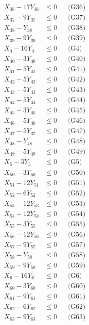 \documentclass[a4paper,10pt]{article}
\begin{document}
{\begin{align}
X_{36} - 17Y_{36} &\leq 0 && \text{(G36)} \\
X_{37} - 9Y_{37} &\leq 0 && \text{(G37)} \\
X_{38} - Y_{38} &\leq 0 && \text{(G38)} \\
X_{39} - 9Y_{39} &\leq 0 && \text{(G39)} \\
X_{4} - 16Y_{4} &\leq 0 && \text{(G4)} \\
X_{40} - 3Y_{40} &\leq 0 && \text{(G40)} \\
X_{41} - 5Y_{41} &\leq 0 && \text{(G41)} \\
X_{42} - 5Y_{42} &\leq 0 && \text{(G42)} \\
X_{43} - 5Y_{43} &\leq 0 && \text{(G43)} \\
X_{44} - 5Y_{44} &\leq 0 && \text{(G44)} \\
\allowbreak
X_{45} - 3Y_{45} &\leq 0 && \text{(G45)} \\
X_{46} - 5Y_{46} &\leq 0 && \text{(G46)} \\
X_{47} - 5Y_{47} &\leq 0 && \text{(G47)} \\
X_{48} - Y_{48} &\leq 0 && \text{(G48)} \\
X_{49} - 5Y_{49} &\leq 0 && \text{(G49)} \\
X_{5} - 3Y_{5} &\leq 0 && \text{(G5)} \\
X_{50} - 3Y_{50} &\leq 0 && \text{(G50)} \\
X_{51} - 12Y_{51} &\leq 0 && \text{(G51)} \\
X_{52} - 6Y_{52} &\leq 0 && \text{(G52)} \\
X_{53} - 12Y_{53} &\leq 0 && \text{(G53)} \\
X_{54} - 12Y_{54} &\leq 0 && \text{(G54)} \\
X_{55} - 3Y_{55} &\leq 0 && \text{(G55)} \\
X_{56} - 12Y_{56} &\leq 0 && \text{(G56)} \\
X_{57} - 9Y_{57} &\leq 0 && \text{(G57)} \\
X_{58} - Y_{58} &\leq 0 && \text{(G58)} \\
X_{59} - 9Y_{59} &\leq 0 && \text{(G59)} \\
X_{6} - 16Y_{6} &\leq 0 && \text{(G6)} \\
X_{60} - 3Y_{60} &\leq 0 && \text{(G60)} \\
X_{61} - 9Y_{61} &\leq 0 && \text{(G61)} \\
X_{62} - 6Y_{62} &\leq 0 && \text{(G62)} \\
\allowbreak
X_{63} - 9Y_{63} &\leq 0 && \text{(G63)} \\

\end{align}}
\end{document}
